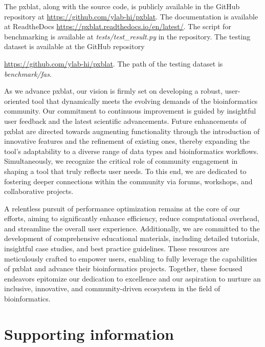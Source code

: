\documentclass[10pt,letterpaper]{article}
\begin{document}
The \gls{pxblat}, along with the source code, is publicly available in the GitHub repository at \url{https://github.com/ylab-hi/pxblat}.
The documentation is available at ReadtheDocs \url{https://pxblat.readthedocs.io/en/latest/}.
The script for benchmarking is available at \emph{tests/test\_result.py} in the repository.
The testing dataset is available at the GitHub repository {\url{https://github.com/ylab-hi/pxblat}.
The path of the testing dataset is \emph{benchmark/fas}.


As we advance \gls{pxblat}, our vision is firmly set on developing a robust, user-oriented tool that dynamically meets the evolving demands of the bioinformatics community.
Our commitment to continuous improvement is guided by insightful user feedback and the latest scientific advancements. Future enhancements of \gls{pxblat} are directed towards augmenting functionality through the introduction of innovative features and the refinement of existing ones, thereby expanding the tool's adaptability to a diverse range of data types and bioinformatics workflows.
Simultaneously, we recognize the critical role of community engagement in shaping a tool that truly reflects user needs. To this end, we are dedicated to fostering deeper connections within the community via forums, workshops, and collaborative projects.

A relentless pursuit of performance optimization remains at the core of our efforts, aiming to significantly enhance efficiency, reduce computational overhead, and streamline the overall user experience.
Additionally, we are committed to the development of comprehensive educational materials, including detailed tutorials, insightful case studies, and best practice guidelines.
These resources are meticulously crafted to empower users, enabling to fully leverage the capabilities of \gls{pxblat} and advance their bioinformatics projects.
Together, these focused endeavors epitomize our dedication to excellence and our aspiration to nurture an inclusive, innovative, and community-driven ecosystem in the field of bioinformatics.

%


\section*{Supporting information}

}
\end{document}
